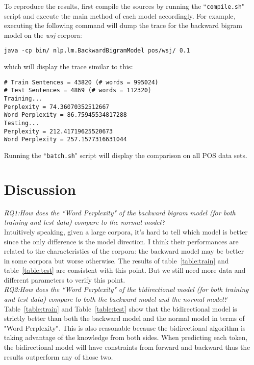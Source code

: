 \documentclass[10pt]{article}
\begin{document}
To reproduce the results, first compile the sources by running the ``\texttt{compile.sh}" script and execute the main method of each model accordingly. For example, executing the following command will dump the trace for the backward bigram model on the \emph{wsj} corpora:
\small
\begin{verbatim}
java -cp bin/ nlp.lm.BackwardBigramModel pos/wsj/ 0.1
\end{verbatim}


which will display the trace similar to this:

\small
\begin{verbatim}
# Train Sentences = 43820 (# words = 995024) 
# Test Sentences = 4869 (# words = 112320)
Training...
Perplexity = 74.36070352512667
Word Perplexity = 86.75945534817288
Testing...
Perplexity = 212.41719625520673
Word Perplexity = 257.1577316631044
\end{verbatim}

Running the ``\texttt{batch.sh}" script will display the comparison on all POS data sets.
\section{Discussion}

\emph{RQ1:How does the ``Word Perplexity" of the backward bigram model (for both training and test data) compare to the normal model?}
\\

Intuitively speaking, given a large corpora, it's hard to tell which model is better since the only difference is the model direction. I think their performances are related to the 
characteristics of the corpora: the backward model may be better in some corpora but worse otherwise. The results of table~\ref{table:train} and table~\ref{table:test} are consistent with this point. But we still need more data and different parameters to verify this point.
\\

\emph{RQ2:How does the ``Word Perplexity" of the bidirectional model (for both training and test data) compare to both the backward model and the normal model?}
\\

Table~\ref{table:train} and Table~\ref{table:test} show that the bidirectional model is strictly better than both the backward model and the normal model in terms of "Word Perplexity". This is also reasonable because the bidirectional algorithm is taking advantage of the knowledge from both sides. When predicting each token, the bidirectional model will have constraints from forward and backward thus the results outperform any of those two. 
\end{document}
